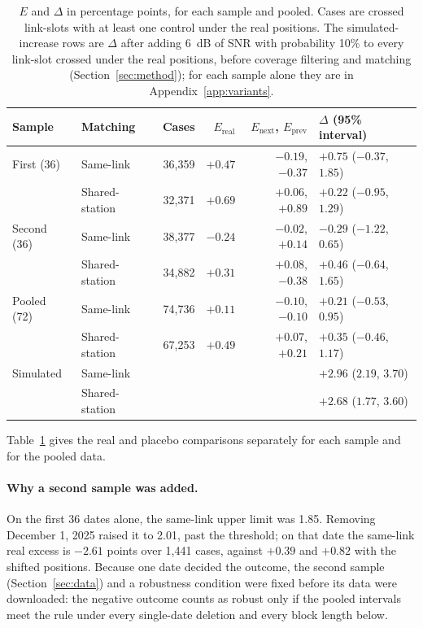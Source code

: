 \documentclass[11pt]{article}
\begin{document}
\begin{table}[h]
\centering
\small
\setlength{\tabcolsep}{3pt}
\begin{tabular}{llrrrl}
\toprule
Sample & Matching & Cases & $E_{\text{real}}$ & $E_{\text{next}}$, $E_{\text{prev}}$ & $\Delta$ (95\% interval) \\
\midrule
First (36) & Same-link & 36{,}359 & $+0.47$ & $-0.19$, $-0.37$ & $+0.75$ ($-0.37$, $1.85$) \\
 & Shared-station & 32{,}371 & $+0.69$ & $+0.06$, $+0.89$ & $+0.22$ ($-0.95$, $1.29$) \\
Second (36) & Same-link & 38{,}377 & $-0.24$ & $-0.02$, $+0.14$ & $-0.29$ ($-1.22$, $0.65$) \\
 & Shared-station & 34{,}882 & $+0.31$ & $+0.08$, $-0.38$ & $+0.46$ ($-0.64$, $1.65$) \\
Pooled (72) & Same-link & 74{,}736 & $+0.11$ & $-0.10$, $-0.10$ & $+0.21$ ($-0.53$, $0.95$) \\
 & Shared-station & 67{,}253 & $+0.49$ & $+0.07$, $+0.21$ & $+0.35$ ($-0.46$, $1.17$) \\
\midrule
Simulated & Same-link & & & & $+2.96$ ($2.19$, $3.70$) \\
 & Shared-station & & & & $+2.68$ ($1.77$, $3.60$) \\
\bottomrule
\end{tabular}
\caption{$E$ and $\Delta$ in percentage points, for each sample and pooled. Cases are crossed link-slots with at least one control under the real positions. The simulated-increase rows are $\Delta$ after adding 6~dB of SNR with probability 10\% to every link-slot crossed under the real positions, before coverage filtering and matching (Section~\ref{sec:method}); for each sample alone they are in Appendix~\ref{app:variants}.}\label{tab:main}
\end{table}

Table~\ref{tab:main} gives the real and placebo comparisons separately for each sample and for the pooled data.

\paragraph{Why a second sample was added.} On the first 36 dates alone, the same-link upper limit was 1.85. Removing December 1, 2025 raised it to 2.01, past the threshold; on that date the same-link real excess is $-2.61$ points over 1{,}441 cases, against $+0.39$ and $+0.82$ with the shifted positions. Because one date decided the outcome, the second sample (Section~\ref{sec:data}) and a robustness condition were fixed before its data were downloaded: the negative outcome counts as robust only if the pooled intervals meet the rule under every single-date deletion and every block length below.
\end{document}
